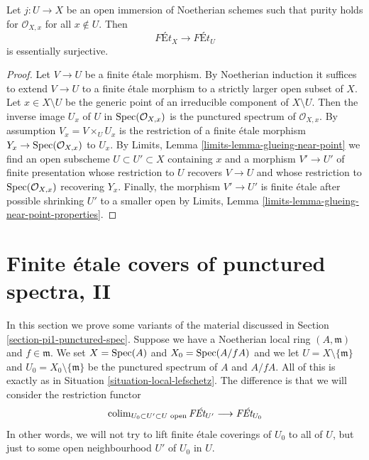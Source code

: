 \begin{lemma}
\label{lemma-extend-pure}
Let $j : U \to X$ be an open immersion of Noetherian schemes
such that purity holds for $\mathcal{O}_{X, x}$ for all $x \not \in U$.
Then
$$
\textit{F\'Et}_X \longrightarrow \textit{F\'Et}_U
$$
is essentially surjective.
\end{lemma}

\begin{proof}
Let $V \to U$ be a finite \'etale morphism. By Noetherian
induction it suffices to extend $V \to U$ to a finite \'etale
morphism to a strictly larger open subset of $X$.
Let $x \in X \setminus U$ be the generic point of
an irreducible component of $X \setminus U$.
Then the inverse image $U_x$ of $U$ in $\mathop{\mathrm{Spec}}(\mathcal{O}_{X, x})$
is the punctured spectrum of $\mathcal{O}_{X, x}$.
By assumption $V_x = V \times_U U_x$ is the restriction
of a finite \'etale morphism $Y_x \to \mathop{\mathrm{Spec}}(\mathcal{O}_{X, x})$
to $U_x$.
By Limits, Lemma \ref{limits-lemma-glueing-near-point}
we find an open subscheme $U \subset U' \subset X$
containing $x$ and a morphism $V' \to U'$ of finite presentation
whose restriction to $U$ recovers $V \to U$ and
whose restriction to $\mathop{\mathrm{Spec}}(\mathcal{O}_{X, x})$ recovering $Y_x$.
Finally, the morphism $V' \to U'$ is finite \'etale
after possible shrinking $U'$ to a smaller open by
Limits, Lemma \ref{limits-lemma-glueing-near-point-properties}.
\end{proof}
















\section{Finite \'etale covers of punctured spectra, II}
\label{section-pi1-punctured-spec-II}

\noindent
In this section we prove some variants of the material discussed
in Section \ref{section-pi1-punctured-spec}. Suppose
we have a Noetherian local ring $(A, \mathfrak m)$ and $f \in \mathfrak m$.
We set $X = \mathop{\mathrm{Spec}}(A)$ and $X_0 = \mathop{\mathrm{Spec}}(A/fA)$ and we
let $U = X \setminus \{\mathfrak m\}$ and
$U_0 = X_0 \setminus \{\mathfrak m\}$ be the punctured spectrum of
$A$ and $A/fA$. All of this is exactly as in
Situation \ref{situation-local-lefschetz}.
The difference is that we will consider the restriction functor
$$
\mathop{\mathrm{colim}}\nolimits_{U_0 \subset U' \subset U\text{ open}} \textit{F\'Et}_{U'}
\longrightarrow
\textit{F\'Et}_{U_0}
$$
In other words, we will not try to lift finite \'etale coverings
of $U_0$ to all of $U$, but just to some open neighbourhood
$U'$ of $U_0$ in $U$.

